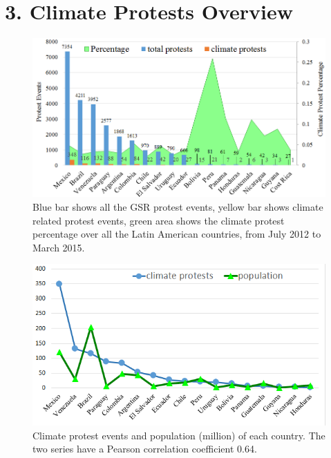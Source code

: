 \documentclass[9pt,twocolumn,twoside]{pnas-new}
\begin{document}
%



\section*{3. Climate Protests Overview}

\begin{figure}[ht]
\centerline
{\includegraphics[width=.45\textwidth]{figures/month-country-protest3}}
\caption{Blue bar shows all the GSR protest events, yellow bar shows climate related protest events, green area shows the climate protest percentage over all the Latin American countries, from July 2012 to March 2015.}
\label{month_percentage}
\end{figure}


\begin{figure}[ht]
\centerline
{\includegraphics[width=.4\textwidth]{figures/protest-population}}
\caption{Climate protest events and population (million) of each country. The two series have a Pearson correlation coefficient 0.64.}
\label{protest-population}
\end{figure}
\end{document}
